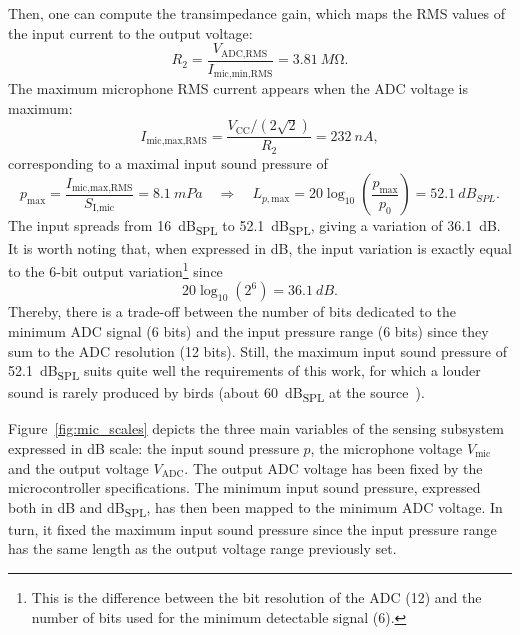 \documentclass{EPL-master-thesis-covers-EN}
\newcommand{\te}[1]{\textrm{#1}}
\begin{document}
Then, one can compute the transimpedance gain, which maps the RMS values of the input current to the output voltage:
\[
 R_2 = \frac{V_\te{ADC,RMS}}{I_{\te{mic,min,RMS}}} = \SI{3.81}{M\ohm}.
\]
The maximum microphone RMS current appears when the ADC voltage is maximum:
\[
 I_{\te{mic,max,RMS}} = \frac{V_\te{CC}/(2\sqrt{2})}{R_2} = \SI{232}{nA},
\]
corresponding to a maximal input sound pressure of
\[
   p_\te{max} = \frac{I_{\te{mic,max,RMS}}}{S_{\te{I,mic}}} = \SI{8.1}{mPa} \quad \Rightarrow \quad L_{p,\te{max}} = 20\log_{10}\left(\frac{p_\te{max}}{p_0}\right) = \SI{52.1}{dB_{SPL}}.
\]
The input spreads from \SI{16}{dB_{SPL}} to \SI{52.1}{dB_{SPL}}, giving a variation of \SI{36.1}{dB}. It is worth noting that, when expressed in dB, the input variation is exactly equal to the 6-bit output variation\footnote{This is the difference between the bit resolution of the ADC (12) and the number of bits used for the minimum detectable signal (6).} since 
\[
 20\log_{10}\left(2^{6}\right) = \SI{36.1}{dB}.
\]
Thereby, there is a trade-off between the number of bits dedicated to the minimum ADC signal (6 bits) and the input pressure range (6 bits) since they sum to the ADC resolution (12 bits). Still, the maximum input sound pressure of \SI{52.1}{dB_{SPL}} suits quite well the requirements of this work, for which a louder sound is rarely produced by birds (about \SI{60}{dB_{SPL}} at the source~\cite{10.1007/s00265-009-0743-4}).

Figure~\ref{fig:mic_scales} depicts the three main variables of the sensing subsystem expressed in dB scale: the input sound pressure $p$, the microphone voltage $V_{\te{mic}}$ and the output voltage $V_\te{ADC}$.
The output ADC voltage has been fixed by the microcontroller specifications.
The minimum input sound pressure, expressed both in \si{dB} and \si{dB_{SPL}}, has then been mapped to the minimum ADC voltage. In turn, it fixed the maximum input sound pressure since the input pressure range has the same length as the output voltage range previously set.
\end{document}
